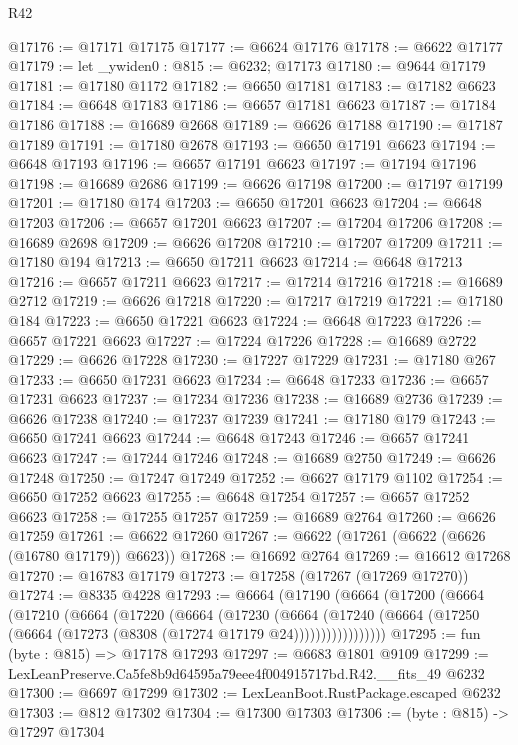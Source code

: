 \begin{lexlean}{R42}
\begin{coremodule}
{@17176 := @17171 @17175
@17177 := @6624 @17176
@17178 := @6622 @17177
@17179 := let _ywiden0 : @815 := @6232; @17173
@17180 := @9644 @17179
@17181 := @17180 @1172
@17182 := @6650 @17181
@17183 := @17182 @6623
@17184 := @6648 @17183
@17186 := @6657 @17181 @6623
@17187 := @17184 @17186
@17188 := @16689 @2668
@17189 := @6626 @17188
@17190 := @17187 @17189
@17191 := @17180 @2678
@17193 := @6650 @17191 @6623
@17194 := @6648 @17193
@17196 := @6657 @17191 @6623
@17197 := @17194 @17196
@17198 := @16689 @2686
@17199 := @6626 @17198
@17200 := @17197 @17199
@17201 := @17180 @174
@17203 := @6650 @17201 @6623
@17204 := @6648 @17203
@17206 := @6657 @17201 @6623
@17207 := @17204 @17206
@17208 := @16689 @2698
@17209 := @6626 @17208
@17210 := @17207 @17209
@17211 := @17180 @194
@17213 := @6650 @17211 @6623
@17214 := @6648 @17213
@17216 := @6657 @17211 @6623
@17217 := @17214 @17216
@17218 := @16689 @2712
@17219 := @6626 @17218
@17220 := @17217 @17219
@17221 := @17180 @184
@17223 := @6650 @17221 @6623
@17224 := @6648 @17223
@17226 := @6657 @17221 @6623
@17227 := @17224 @17226
@17228 := @16689 @2722
@17229 := @6626 @17228
@17230 := @17227 @17229
@17231 := @17180 @267
@17233 := @6650 @17231 @6623
@17234 := @6648 @17233
@17236 := @6657 @17231 @6623
@17237 := @17234 @17236
@17238 := @16689 @2736
@17239 := @6626 @17238
@17240 := @17237 @17239
@17241 := @17180 @179
@17243 := @6650 @17241 @6623
@17244 := @6648 @17243
@17246 := @6657 @17241 @6623
@17247 := @17244 @17246
@17248 := @16689 @2750
@17249 := @6626 @17248
@17250 := @17247 @17249
@17252 := @6627 @17179 @1102
@17254 := @6650 @17252 @6623
@17255 := @6648 @17254
@17257 := @6657 @17252 @6623
@17258 := @17255 @17257
@17259 := @16689 @2764
@17260 := @6626 @17259
@17261 := @6622 @17260
@17267 := @6622 (@17261 (@6622 (@6626 (@16780 @17179)) @6623))
@17268 := @16692 @2764
@17269 := @16612 @17268
@17270 := @16783 @17179
@17273 := @17258 (@17267 (@17269 @17270))
@17274 := @8335 @4228
@17293 := @6664
    (@17190
      (@6664
        (@17200
          (@6664
            (@17210
              (@6664
                (@17220
                  (@6664
                    (@17230
                      (@6664
                        (@17240
                          (@6664 (@17250 (@6664 (@17273 (@8308 (@17274 @17179 @24)))))))))))))))))
@17295 := fun (byte : @815) => @17178 @17293
@17297 := @6683 @1801 @9109
@17299 := LexLeanPreserve.Ca5fe8b9d64595a79eee4f004915717bd.R42.__fits_49 @6232
@17300 := @6697 @17299
@17302 := LexLeanBoot.RustPackage.escaped @6232
@17303 := @812 @17302
@17304 := @17300 @17303
@17306 := (byte : @815) -> @17297 @17304
}
\end{coremodule}
\end{lexlean}
